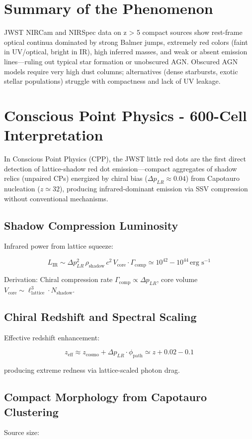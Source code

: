\documentclass[11pt]{article}
\begin{document}
\section{Summary of the Phenomenon}
JWST NIRCam and NIRSpec data on z > 5 compact sources show rest-frame optical continua dominated by strong Balmer jumps, extremely red colors (faint in UV/optical, bright in IR), high inferred masses, and weak or absent emission lines—ruling out typical star formation or unobscured AGN. Obscured AGN models require very high dust columns; alternatives (dense starbursts, exotic stellar populations) struggle with compactness and lack of UV leakage.

\section{Conscious Point Physics - 600-Cell Interpretation}
In Conscious Point Physics (CPP), the JWST little red dots are the first direct detection of lattice-shadow red dot emission—compact aggregates of shadow relics (unpaired CPs) energized by chiral bias ($\Delta p_{LR} \approx 0.04$) from Capotauro nucleation ($z \simeq 32$), producing infrared-dominant emission via SSV compression without conventional mechanisms.

\subsection{Shadow Compression Luminosity}
Infrared power from lattice squeeze:

\[
L_{\text{IR}} \sim \Delta p_{LR}^2 \, \rho_{\text{shadow}} \, c^2 \, V_{\text{core}} \cdot \Gamma_{\text{comp}} \simeq 10^{42} - 10^{44} \, \text{erg s}^{-1}
\]

Derivation: Chiral compression rate $\Gamma_{\text{comp}} \propto \Delta p_{LR}$, core volume $V_{\text{core}} \sim \ell_{\text{lattice}}^3 \cdot N_{\text{shadow}}$.

\subsection{Chiral Redshift and Spectral Scaling}
Effective redshift enhancement:

\[
z_{\text{eff}} \approx z_{\text{cosmo}} + \Delta p_{LR} \cdot \phi_{\text{path}} \simeq z + 0.02 - 0.1
\]

producing extreme redness via lattice-scaled photon drag.

\subsection{Compact Morphology from Capotauro Clustering}
Source size:
\end{document}

